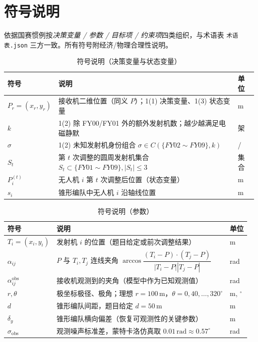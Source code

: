 \documentclass[12pt,a4paper]{ctexart}
\newcommand{\unit}[1]{\ensuremath{\,\mathrm{#1}}}
\begin{document}
\section{符号说明}

依据国赛惯例按\emph{决策变量 / 参数 / 目标项 / 约束项}四类组织，与术语表 \texttt{术语表.json} 三方一致。所有符号附经济/物理合理性说明。

\begin{table}[H]
\centering
\caption{符号说明（决策变量与状态变量）}
\label{tab:sym-decision}
\begin{tabular}{lll}
\toprule
符号 & 说明 & 单位 \\
\midrule
$P_r=(x_r,y_r)$ & 接收机二维位置（同义 $P$）；1(1) 决策变量、1(3) 状态变量 & m \\
$k$ & 1(2) 除 FY00/FY01 外的额外发射机数；越少越满足电磁静默 & 架 \\
$\sigma$ & 1(2) 未知发射机身份组合 $\sigma\in C(\{FY02\sim FY09\},k)$ & / \\
$S_t$ & 第 $t$ 次调整的圆周发射机集合 $S_t\subset\{FY01\sim FY09\},|S_t|\le 3$ & 集合 \\
$P_i^{(t)}$ & 无人机 $i$ 第 $t$ 次调整后位置（状态变量） & m \\
$s_i$ & 锥形编队中无人机 $i$ 沿轴线位置 & m \\
\bottomrule
\end{tabular}
\end{table}

\begin{table}[H]
\centering
\caption{符号说明（参数）}
\label{tab:sym-param}
\begin{tabular}{lll}
\toprule
符号 & 说明 & 单位 \\
\midrule
$T_i=(x_i,y_i)$ & 发射机 $i$ 的位置（题目给定或前次调整结果） & m \\
$\alpha_{ij}$ & $P$ 与 $T_i,T_j$ 连线夹角 $\arccos\dfrac{(T_i-P)\cdot(T_j-P)}{|T_i-P||T_j-P|}$ & rad \\
$\alpha_{ij}^{\text{obs}}$ & 接收机观测到的夹角（模型中作为已知观测值） & rad \\
$r,\theta$ & 极坐标极径、极角；理想 $r=100\unit{m}$，$\theta=0,40,\dots,320^\circ$ & m, $^\circ$ \\
$d$ & 锥形编队间距，题目给定 $d=50\unit{m}$ & m \\
$\delta_y$ & 锥形编队横向偏差（恢复可观测性的关键参数） & m \\
$\sigma_{\text{obs}}$ & 观测噪声标准差，蒙特卡洛仿真取 $0.01\unit{rad}\approx 0.57^\circ$ & rad \\
\bottomrule
\end{tabular}
\end{table}
\end{document}
